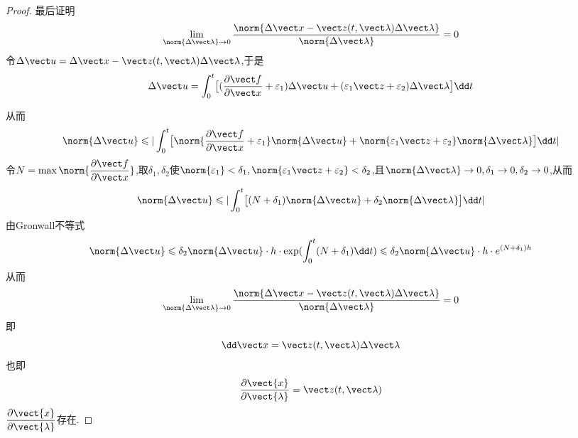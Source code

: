 \begin{proof}
	最后证明
	\[\lim\limits_{\norm{\Delta\vect\lambda}\to 0 }\frac{\norm{\Delta\vect x-\vect z(t,\vect \lambda)\Delta\vect\lambda}}{\norm{\Delta\vect\lambda}}=0\]
	令$\Delta\vect u =\Delta\vect x- \vect z(t,\vect \lambda)\Delta\vect\lambda$,于是
	\[\Delta\vect u = \int_{0}^{t}\bigl[(\frac{\partial\vect f}{\partial\vect x}+\varepsilon_1)\Delta\vect u + (\varepsilon_1 \vect z+\varepsilon_2)\Delta\vect\lambda\bigr]\dd t\]
	
	从而
	\[\norm{\Delta\vect u}\leqslant |\int_{0}^{t}\bigl[\norm{\frac{\partial\vect f}{\partial\vect x}+\varepsilon_1}\norm{\Delta\vect u} + \norm{\varepsilon_1 \vect z+\varepsilon_2}\norm{\Delta\vect\lambda}\bigr]\dd t| \]
	令$N = \max\norm{\dfrac{\partial\vect f}{\partial\vect x}}$,取$\delta_1,\delta_2$使$\norm{\varepsilon_1}<\delta_1,\norm{\varepsilon_1 \vect z+\varepsilon_2}<\delta_2$,且$\norm{\Delta\vect\lambda} \to 0,\delta_1\to 0 ,\delta_2\to 0 $,从而
	\[\norm{\Delta\vect u}\leqslant |\int_{0}^{t}\bigl[(N+\delta_1)\norm{\Delta\vect u} + \delta_2\norm{\Delta\vect\lambda}\bigr]\dd t|\]
	由Gronwall不等式
	\[\norm{\Delta\vect u}\leqslant\delta_2\norm{\Delta\vect u}\cdot h \cdot \exp(\int_{0}^{t}(N+\delta_1)\dd t)\leqslant\delta_2\norm{\Delta\vect u}\cdot h \cdot e^{(N+\delta_1)h}\]
	从而\[\lim\limits_{\norm{\Delta\vect\lambda}\to 0 }\frac{\norm{\Delta\vect x-\vect z(t,\vect \lambda)\Delta\vect\lambda}}{\norm{\Delta\vect\lambda}}=0\]即
	\[\dd \vect x=\vect z(t,\vect\lambda)\Delta\vect \lambda\]
	也即
	\[\dfrac{\partial\vect{x}}{\partial\vect{\lambda}}=\vect z(t,\vect\lambda)\]
	$\dfrac{\partial\vect{x}}{\partial\vect{\lambda}}$存在.
\end{proof}

